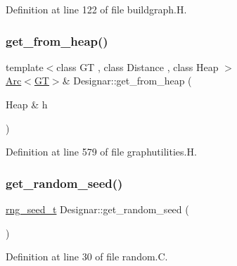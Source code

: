 Definition at line 122 of file buildgraph.\+H.

\mbox{\label{namespace_designar_a6f1ec5f4fb17e9a3c3a6b02f724764f6}} 
\subsubsection{\texorpdfstring{get\+\_\+from\+\_\+heap()}{get\_from\_heap()}}
{\footnotesize\ttfamily template$<$class GT , class Distance , class Heap $>$ \\
\hyperlink{namespace_designar_a3f55fb5513d62ff47cbc8f72b8e95d6f}{Arc}$<$\hyperlink{demo-buildgraph_8_c_a3001c40d2c31ca87ed96cd7d1334a55e}{GT}$>$\& Designar\+::get\+\_\+from\+\_\+heap (\begin{DoxyParamCaption}\item[{Heap \&}]{h }\end{DoxyParamCaption})}



Definition at line 579 of file graphutilities.\+H.

\mbox{\label{namespace_designar_a39f540907bf568cf8e9983cffbc5246c}} 
\subsubsection{\texorpdfstring{get\+\_\+random\+\_\+seed()}{get\_random\_seed()}}
{\footnotesize\ttfamily \hyperlink{namespace_designar_ad621b5646d45288c5d6a1e1dfe7531a8}{rng\+\_\+seed\+\_\+t} Designar\+::get\+\_\+random\+\_\+seed (\begin{DoxyParamCaption}{ }\end{DoxyParamCaption})}



Definition at line 30 of file random.\+C.

\mbox{\label{namespace_designar_a279a11030cf78659ddbdec00473f0365}} 
